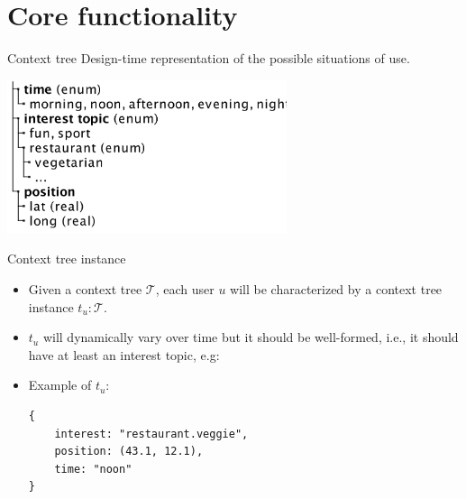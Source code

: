 \documentclass[smaller]{beamer}
\begin{document}
\section{Core functionality}
\label{sec:orgheadline9}
\begin{frame}[label={sec:orgheadline5}]{Context tree}
Design-time representation of the possible situations of use.

\begin{center}
\includegraphics[height=4.5cm]{images/tree.png}
\end{center}
\end{frame}

\begin{frame}[fragile,label={sec:orgheadline6}]{Context tree instance}
 \begin{itemize}
\item Given a context tree \(\mathcal{T}\), each user \(u\) will be characterized by a context tree instance 
\(t_u : \mathcal{T}\).

\item \(t_u\) will dynamically vary over time but it should be well-formed, i.e., it should have
at least an interest topic, e.g:

\item Example of \(t_u\):
\begin{verbatim}
{ 
    interest: "restaurant.veggie", 
    position: (43.1, 12.1), 
    time: "noon"
}
\end{verbatim}
\end{itemize}
\end{frame}
\end{document}

